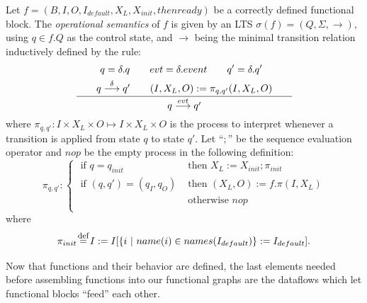 \documentclass[runningheads]{llncs}
\newcommand{\eqdef}{\stackrel{\mathclap{\normalfont\mbox{\footnotesize def}}}{=}}
\newcommand{\aoverb}[2]{\stackrel{\mathclap{\footnotesize #1}}{#2}}
\newcommand{\s}{\hspace{1em}}
\begin{document}
\begin{definition}
    Let $f = (B, I, O, I_{default},X_L, X_{init}, then ready)$ be a correctly defined functional block. The \emph{operational semantics} of $f$ is given by an LTS $\sigma(f) = (Q,\Sigma, \rightarrow)$, using $q \in f.Q$ as the control state, and $\rightarrow$ being the minimal transition relation inductively defined by the rule:
    \begin{equation}
        \centering
        \begin{split}
            q = \delta.q \s\s evt = \delta.event\s\s q' = \delta.q'\s\s\s\\
            \cfrac{
                \s\s q\aoverb{\delta}{\longrightarrow}q' \s\s(I,X_L,O) := \pi_{q,q'}(I,X_L,O)\s\s
            }
            {
                q \aoverb{evt}{\longrightarrow} q'
            }
        \end{split}
    \end{equation}
    where $\pi_{q,q'} : I \times X_L \times O \mapsto I \times X_L \times O$ is the process to interpret whenever a transition is applied from state $q$ to state $q'$. Let ``$;$'' be the sequence evaluation operator and $nop$ be the empty process in the following definition:
    \begin{equation*}
        \pi_{q,q'}:
        \begin{cases}
            \text{ if } q = q_{init} & \text{ then } X_L:= X_{init}; \pi_{init}\\
            \text{ if } (q,q') = (q_{I}, q_{O}) & \text{ then } (X_L, O) := f.\pi(I,X_L)\\
            & \text{ otherwise } nop\\
        \end{cases}
    \end{equation*}
    where
    \begin{equation*}
        \pi_{init} \eqdef I := I[\{ i~|~name(i) \in names(I_{default}) \} := I_{default}].
    \end{equation*}
\end{definition}

Now that functions and their behavior are defined, the last elements needed before assembling functions into our functional graphs are the dataflows which let functional blocks ``feed'' each other.
\end{document}

